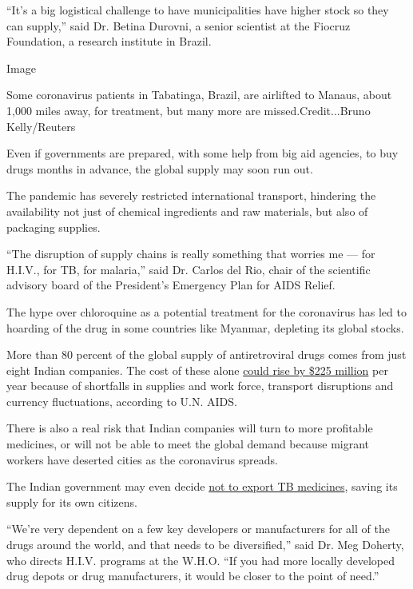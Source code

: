 ``It's a big logistical challenge to have municipalities have higher
stock so they can supply,'' said Dr. Betina Durovni, a senior scientist
at the Fiocruz Foundation, a research institute in Brazil.

Image

Some coronavirus patients in Tabatinga, Brazil, are airlifted to Manaus,
about 1,000 miles away, for treatment, but many more are
missed.Credit...Bruno Kelly/Reuters

Even if governments are prepared, with some help from big aid agencies,
to buy drugs months in advance, the global supply may soon run out.

The pandemic has severely restricted international transport, hindering
the availability not just of chemical ingredients and raw materials, but
also of packaging supplies.

``The disruption of supply chains is really something that worries me
--- for H.I.V., for TB, for malaria,'' said Dr. Carlos del Rio, chair of
the scientific advisory board of the President's Emergency Plan for AIDS
Relief.

The hype over chloroquine as a potential treatment for the coronavirus
has led to hoarding of the drug in some countries like Myanmar,
depleting its global stocks.

More than 80 percent of the global supply of antiretroviral drugs comes
from just eight Indian companies. The cost of these alone
\href{https://www.unaids.org/en/resources/presscentre/pressreleaseandstatementarchive/2020/june/20200622_availability-and-cost-of-antiretroviral-medicines}{could
rise by \$225 million} per year because of shortfalls in supplies and
work force, transport disruptions and currency fluctuations, according
to U.N. AIDS.

There is also a real risk that Indian companies will turn to more
profitable medicines, or will not be able to meet the global demand
because migrant workers have deserted cities as the coronavirus spreads.

The Indian government may even decide
\href{https://theprint.in/health/india-could-ban-export-of-anti-tb-drugs-as-lockdown-hits-production/406119/}{not
to export TB medicines}, saving its supply for its own citizens.

``We're very dependent on a few key developers or manufacturers for all
of the drugs around the world, and that needs to be diversified,'' said
Dr. Meg Doherty, who directs H.I.V. programs at the W.H.O. ``If you had
more locally developed drug depots or drug manufacturers, it would be
closer to the point of need.''

